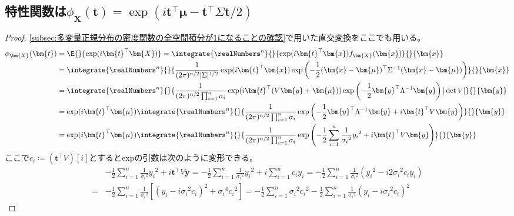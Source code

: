         \subsection{特性関数は\texorpdfstring{$\phi_{\bm{X}}(\bm{t})=\exp(i\bm{t}^\top\bm{\mu} - \bm{t}^\top\Sigma\bm{t}/2)$}{φ\_X (t) = exp(i t\string^T μ - t\string^T Σ t/2)}}
            \begin{proof}
                \quad\par
                \ref{subsec:多変量正規分布の密度関数の全空間積分が1になることの確認}で用いた直交変換をここでも用いる。
                \begin{align*}
                    \phi_{\bm{X}}(\bm{t}) &= \E{}{\exp(i\bm{t}^\top \bm{X})} = \integrate{\realNumbers^n}{}{\exp(i\bm{t}^\top\bm{x})f_{\bm{X}}(\bm{x})}{}{\bm{x}} \\
                    &= \integrate{\realNumbers^n}{}{\frac{1}{(2\pi)^{n/2}|\Sigma|^{1/2}}\exp(i\bm{t}^\top\bm{x})\exp\left(-\frac{1}{2}(\bm{x}-\bm{\mu})^\top\Sigma^{-1}(\bm{x}-\bm{\mu})\right)}{}{\bm{x}} \\
                    &= \integrate{\realNumbers^n}{}{\frac{1}{(2\pi)^{n/2}\prod_{i=1}^n\sigma_i}\exp(i\bm{t}^\top(V\bm{y}+\bm{\mu}))\exp\left(-\frac{1}{2}\bm{y}^\top\Lambda^{-1}\bm{y}\right)|\det V|}{}{\bm{y}} \\
                    &= \exp(i\bm{t}^\top\bm{\mu})\integrate{\realNumbers^n}{}{\frac{1}{(2\pi)^{n/2}\prod_{i=1}^n\sigma_i}\exp\left(-\frac{1}{2}\bm{y}^\top\Lambda^{-1}\bm{y} + i\bm{t}^\top V\bm{y}\right)}{}{\bm{y}} \\
                    &= \exp(i\bm{t}^\top\bm{\mu})\integrate{\realNumbers^n}{}{\frac{1}{(2\pi)^{n/2}\prod_{i=1}^n\sigma_i}\exp\left(-\frac{1}{2}\sum_{i=1}^n\frac{1}{{\sigma_i}^2}{y_i}^2 + i\bm{t}^\top V\bm{y}\right)}{}{\bm{y}}
                \end{align*}
                ここで$c_i \coloneqq (\bm{t}^\top V)[i]$とするとexpの引数は次のように変形できる。
                \begin{align*}
                    & -\frac{1}{2}\sum_{i=1}^n\frac{1}{{\sigma_i}^2}{y_i}^2 + i\bm{t}^\top V\bm{y} = -\frac{1}{2}\sum_{i=1}^n\frac{1}{{\sigma_i}^2}{y_i}^2 + i\sum_{i=1}^n c_iy_i = -\frac{1}{2}\sum_{i=1}^n\frac{1}{{\sigma_i}^2}\left({y_i}^2 - i2{\sigma_i}^2c_iy_i\right) \\
                    =& -\frac{1}{2}\sum_{i=1}^n\frac{1}{{\sigma_i}^2}\left[\left(y_i - i{\sigma_i}^2c_i\right)^2 + {\sigma_i}^4{c_i}^2\right] = -\frac{1}{2}\sum_{i=1}^n{\sigma_i}^2{c_i}^2 - \frac{1}{2}\sum_{i=1}^n\frac{1}{{\sigma_i}^2}\left(y_i - i{\sigma_i}^2c_i\right)^2

\end{align*}
\end{proof}
